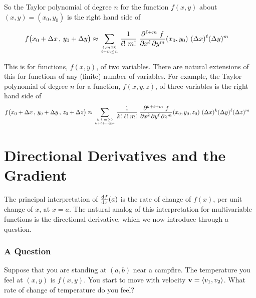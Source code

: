 %
%
So the Taylor polynomial of degree $n$ for the function $f(x,y)$ 
about $(x,y)=(x_0,y_0)$ is the right hand side of
\begin{impeqn}\label{eqn Taylor n 2d}
\begin{align*}
f\big(x_0 + \De x\,,\,y_0+\De y\big)
&\approx  
    \sum_{\Atop{\ell,m\ge 0}{\ell+m\le n}}  \frac{1}{\ell!\ m!}\ 
         \frac{\partial^{\ell+m}\ f}{\partial x^\ell\,\partial y^m}(x_0,y_0)\ 
         (\De x)^\ell (\De y)^m
\end{align*}
\end{impeqn}
This is for functions, $f(x,y)$, of two variables. There are natural
extensions of this for functions of any (finite) number of variables.
For example, the Taylor polynomial of degree $n$ for a function, $f(x,y,z)$,
of three variables is the right hand side of 
\begin{align*}
f\big(x_0 + \De x\,,\,y_0+\De y\,,\,z_0+\De z\big)
&\approx  
    \sum_{\Atop{k,\ell,m\ge 0}{k+\ell+m\le n}}  \frac{1}{k!\ \ell!\ m!}\ 
         \frac{\partial^{k+\ell+m}\ f}
                 {\partial x^k\,\partial y^\ell\,\partial z^m}(x_0,y_0,z_0)\ 
         (\De x)^k (\De y)^\ell (\De z)^m
\end{align*}


\section{Directional Derivatives and the Gradient}\label{sec directional derivatives}

The principal interpretation of $\diff{f}{x}(a)$ is the rate of change of
$f(x)$, per unit change of $x$, at $x=a$. The natural analog of this
interpretation for multivariable functions is the directional derivative,
which we now introduce through a question.

\subsubsection{A Question}
Suppose that you are standing at $(a,b)$ near a campfire.
The temperature you feel at $(x,y)$ is $f(x,y)$. You start
to move with velocity $\mathbf{v}=\left< v_1,v_2\right> $. What rate of change of temperature do you feel? 

